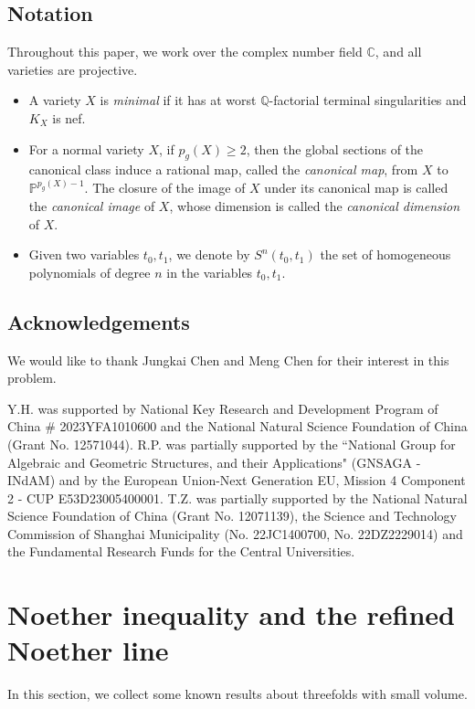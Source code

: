 \documentclass[a4paper,11pt]{amsart}
\newcommand{\CC}{\ensuremath{\mathbb{C}}}
\newcommand{\PP}{\ensuremath{\mathbb{P}}}
\newcommand{\QQ}{\ensuremath{\mathbb{Q}}}
\theoremstyle{definition}
\theoremstyle{remark}
\numberwithin{equation}{section}
\begin{document}
\subsection{Notation}
Throughout this paper, we work over the complex number field $\CC$, and all varieties are projective. 
\begin{itemize}
	\item A variety $X$ is {\em minimal} if it has at worst $\QQ$-factorial terminal singularities and $K_X$ is nef.
	
	\item For a normal variety $X$, if $p_g(X) \ge 2$, then the global sections of the canonical class induce a rational map, called the {\em canonical map}, from $X$ to $\PP^{p_g(X)-1}$. The closure of the image of $X$ under its canonical map is called the {\em canonical image} of $X$, whose dimension is called the \emph{canonical dimension} of $X$.

    \item Given two variables $t_0, t_1$, we denote by $S^n(t_0,t_1)$ the set of homogeneous polynomials of degree $n$ in the variables $t_0, t_1$. %
\end{itemize}

\subsection*{Acknowledgements} We would like to thank Jungkai Chen and Meng Chen for their interest in this problem.

Y.H. was supported by National Key Research and Development Program of China \# 2023YFA1010600 and the National Natural Science Foundation of China (Grant No. 12571044). R.P. was partially supported by the ``National Group for Algebraic and Geometric Structures, and their Applications" (GNSAGA - INdAM) and by the European Union-Next Generation EU, Mission 4 Component 2 - CUP E53D23005400001. T.Z. was partially supported by the National Natural Science Foundation of China (Grant No. 12071139), the Science and Technology Commission of Shanghai Municipality (No. 22JC1400700, No. 22DZ2229014) and the Fundamental Research Funds for the Central Universities.


\section{Noether inequality and the refined Noether line} \label{section: Noether line}
In this section, we collect some known results about threefolds with small volume. 
\end{document}
